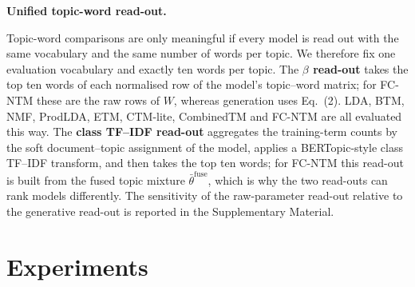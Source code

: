 \documentclass[Journal,letterpaper,NoLists]{ascelike-new}
\begin{document}
\noindent\textbf{Unified topic-word read-out.} \label{sec:readout}

Topic-word comparisons are only meaningful if every model is read out with the same vocabulary and
the same number of words per topic. We therefore fix one evaluation vocabulary and exactly ten
words per topic. The \textbf{$\beta$ read-out} takes the top ten words of each normalised row of
the model's topic--word matrix; for FC-NTM these are the raw rows of $W$, whereas generation
uses Eq.~(2). LDA, BTM, NMF, ProdLDA, ETM, CTM-lite, CombinedTM and FC-NTM are all
evaluated this way. The \textbf{class TF--IDF read-out} aggregates the training-term counts by the
soft document--topic assignment of the model, applies a BERTopic-style class TF--IDF transform,
and then takes the top ten words; for FC-NTM this read-out is built from the fused topic mixture
$\bar\theta^{\mathrm{fuse}}$, which is why the two read-outs can rank models differently. The
sensitivity of the raw-parameter read-out relative to the generative read-out is reported in the
Supplementary Material.

\section{Experiments}
\end{document}
